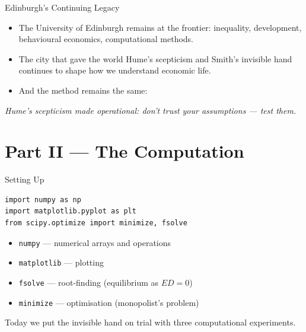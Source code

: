 \documentclass[aspectratio=169, 10pt]{beamer}
\begin{document}
\begin{frame}{Edinburgh's Continuing Legacy}
\begin{itemize}
  \item The University of Edinburgh remains at the frontier: inequality,
        development, behavioural economics, computational methods.
  \item The city that gave the world Hume's scepticism and Smith's
        invisible hand continues to shape how we understand economic life.
  \item And the method remains the same:
\end{itemize}
\vspace{0.5em}
\begin{center}
\end{center}
\vspace{0.3em}
\begin{center}
\textit{Hume's scepticism made operational: don't trust your
assumptions --- test them.}
\end{center}
\end{frame}

\section{Part II --- The Computation}

\begin{frame}[fragile]{Setting Up}
\begin{lstlisting}
import numpy as np
import matplotlib.pyplot as plt
from scipy.optimize import minimize, fsolve
\end{lstlisting}
\vspace{0.5em}
\begin{itemize}
  \item \texttt{numpy} --- numerical arrays and operations
  \item \texttt{matplotlib} --- plotting
  \item \texttt{fsolve} --- root-finding (equilibrium as $ED = 0$)
  \item \texttt{minimize} --- optimisation (monopolist's problem)
\end{itemize}
\vspace{0.3em}
Today we put the invisible hand on trial with three computational
experiments.
\end{frame}
\end{document}
